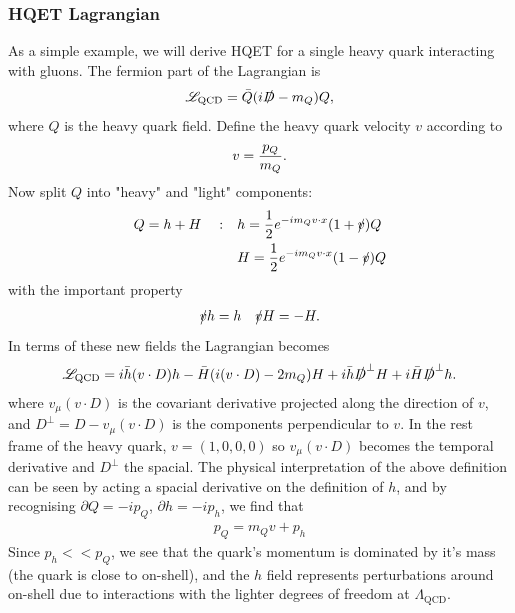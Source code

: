 \subsubsection{HQET Lagrangian}

As a simple example, we will derive HQET for a single heavy quark interacting with gluons. The fermion part of the Lagrangian is
\begin{align}
	\mathscr{L}_{\text{QCD}} = \bar{Q} ( i\slashed{D} - m_Q ) Q,
	\label{eq:dirac}
\end{align}
where $Q$ is the heavy quark field. Define the heavy quark velocity $v$ according to
\begin{align}
	v = {p_Q \over m_Q}.
\end{align}
Now split $Q$ into "heavy" and "light" components:
\begin{align}
	\label{eq:hdef}
	Q = h + H\quad : \quad &h = {1\over 2} e^{-im_Q v\cdot x} ( 1 + \slashed{v} ) Q \\
	&H = {1\over 2} e^{-im_Q v\cdot x} ( 1 - \slashed{v} ) Q
\end{align}
with the important property
\begin{align}
	\slashed{v} h = h \quad \slashed{v} H = - H.
\end{align}
In terms of these new fields the Lagrangian becomes
\begin{align}
	\mathscr{L}_{\text{QCD}} = i\bar{h} (v\cdot D) h - \bar{H} ( i(v\cdot D) - 2m_Q ) H 
		+ i \bar{h} \slashed{D}^{\perp} H + i \bar{H} \slashed{D}^{\perp} h.
		\label{eq:HQET_preintegral}
\end{align}
where $v_{\mu}(v\cdot D)$ is the covariant derivative projected along the direction of $v$, and $D^{\perp} = D - v_{\mu}(v\cdot D)$ is the components perpendicular to $v$. In the rest frame of the heavy quark, $v = (1,0,0,0)$ so $v_{\mu}(v\cdot D)$ becomes the temporal derivative and $D^{\perp}$ the spacial. The physical interpretation of the above definition can be seen by acting a spacial derivative on the definition of $h$, and by recognising $\partial Q = -i p_Q$, $\partial h = -i p_h$, we find that
\begin{align}
	p_Q = m_Q v + p_h
\end{align} 
Since $p_h << p_Q$, we see that the quark's momentum is dominated by it's mass (the quark is close to on-shell), and the $h$ field represents perturbations around on-shell due to interactions with the lighter degrees of freedom at $\Lambda_{\text{QCD}}$.
\\ \\
